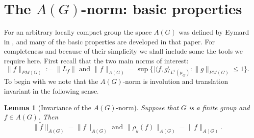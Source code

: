 \documentclass[12pt]{amsart}
\numberwithin{equation}{section}
\theoremstyle{plain}
\newtheorem{lemma}[subsection]{Lemma}
\theoremstyle{definition}
\renewcommand{\leq}{\leqslant}
\begin{document}
\section{The $A(G)$-norm: basic properties}\label{sec.algnormprop}

For an arbitrary locally compact group the space $A(G)$ was defined by Eymard in \cite{PE}, and many of the basic properties are developed in that paper.  For completeness and because of their simplicity we shall include some the tools we require here.  First recall that the two main norms of interest:
\begin{equation*}
\|f\|_{PM(G)}:=\|L_f\| \textrm{ and } \|f\|_{A(G)}=\sup\{|\langle f,g\rangle_{L^2(\mu_G)}: \|g\|_{PM(G)} \leq 1\}.
\end{equation*}
To begin with we note that the $A(G)$-norm is involution and translation invariant in the following sense.
\begin{lemma}[Invariance of the $A(G)$-norm]\label{lem.invariance}
Suppose that $G$ is a  finite group and $f \in A(G)$.  Then
\begin{equation*}
\|\tilde{f}\|_{A(G)} = \|f\|_{A(G)} \textrm{ and } \|\rho_y(f)\|_{A(G)} = \|f\|_{A(G)}.
\end{equation*}
\end{lemma}
\end{document}
